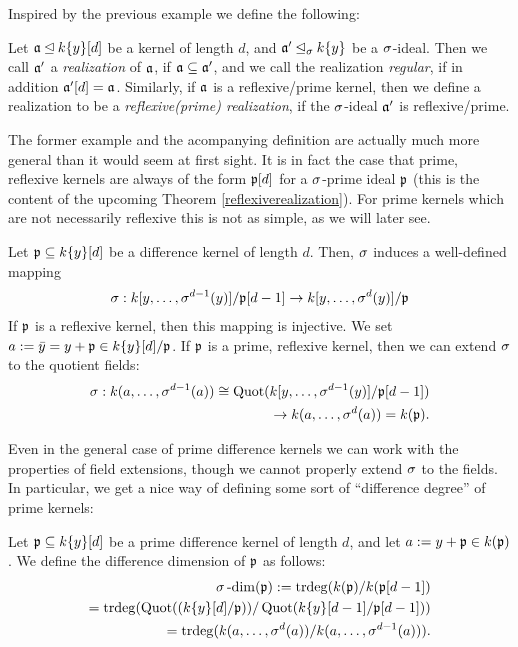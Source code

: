 Inspired by the previous example we define the following:
\begin{defn}
Let $\mathfrak{a} \unlhd k\{y\}[d]$ be a kernel of length $d$, and $\mathfrak{a}' \unlhd_{\sigma} k\{y\}$ be a $\sigma$-ideal. Then we call $\mathfrak{a}'$ a \emph{realization} of $\mathfrak{a}$, if $\mathfrak{a} \subseteq \mathfrak{a}'$, 
and we call the realization \emph{regular}, if in addition $\mathfrak{a}'[d] = \mathfrak{a}$. Similarly, if $\mathfrak{a}$ is a reflexive/prime kernel, then we define a realization to be a \emph{reflexive(prime) realization}, if the $\sigma$-ideal $\mathfrak{a}'$ is reflexive/prime.
\end{defn}

The former example and the acompanying definition are actually much more general than it would seem at first sight. 
It is in fact the case that prime, reflexive kernels are always of the form $\mathfrak{p}[d]$ for a $\sigma$-prime ideal $\mathfrak{p}$ (this is the content of the upcoming Theorem \ref{reflexiverealization}).
For prime kernels which are not necessarily reflexive this is not as simple, as we will later see.

\begin{rem}\label{sigmawelldeffker}
Let $\mathfrak{p} \subseteq k\{y\}[d]$ be a difference kernel of length $d$. Then, $\sigma$ induces a well-defined mapping 
\begin{align*}
\sigma: k[y,\ldots,\sigma^{d-1}(y)]/\mathfrak{p}[d-1] \rightarrow k[y,\ldots,\sigma^{d}(y)]/\mathfrak{p}
\end{align*}
If $\mathfrak{p}$ is a reflexive kernel, then this mapping is injective. 
We set $a := \bar y = y + \mathfrak{p} \in k\{y\}[d]/\mathfrak{p}$. If $\mathfrak{p}$ is a prime, reflexive kernel, then we can extend $\sigma$ to the quotient fields:
\begin{align*} \sigma: k(a,\ldots,\sigma^{d-1}(a)) \cong \text{Quot}(k[y,\ldots,\sigma^{d-1}(y)]/\mathfrak{p}[d-1]) \\ \rightarrow k(a,\ldots,\sigma^d(a)) = k(\mathfrak{p}). \end{align*}
\end{rem}

Even in the general case of prime difference kernels we can work with the properties of field extensions, though we cannot properly extend $\sigma$ to the fields.
 In particular, we get a nice way of defining some sort of ``difference degree'' of prime kernels:
\begin{defn}
Let $\mathfrak{p} \subseteq k\{y\}[d]$ be a prime difference kernel of length $d$, and let $a:= y + \mathfrak{p} \in k(\mathfrak{p})$. We define the difference dimension of $\mathfrak{p}$ as follows:
\begin{align*}  \sigma\operatorname{-dim}(\mathfrak{p}) := \operatorname{trdeg}(k(\mathfrak{p})/k(\mathfrak{p}[d-1])  \\ = \operatorname{trdeg}(\operatorname{Quot}((k\{y\}[d]/\mathfrak{p}))/\operatorname{Quot}(k\{y\}[d-1]/\mathfrak{p}[d-1])) \\  = \operatorname{trdeg}(k(a,\ldots,\sigma^{d}(a))/k(a,\ldots,\sigma^{d-1}(a))). \end{align*}
\end{defn}

